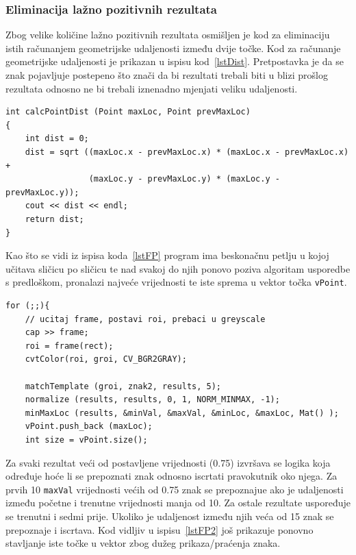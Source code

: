 \newpage
\subsubsection{Eliminacija lažno pozitivnih rezultata} %
\label{ssub:Eliminacija lažno pozitivnih rezultata}

Zbog velike količine lažno pozitivnih rezultata osmišljen je kod za
eliminaciju istih računanjem geometrijske udaljenosti između dvije
točke. Kod za računanje geometrijske udaljenosti je prikazan u ispisu
kod~\ref{lstDist}. Pretpostavka je da se znak pojavljuje postepeno što
znači da bi rezultati trebali biti u blizi prošlog rezultata odnosno ne
bi trebali iznenadno mjenjati veliku udaljenosti. 

\begin{lstlisting}[label=lstDist,caption={Izvorni kod računanja
geometrijske udaljenosti između dvije točke}]
int calcPointDist (Point maxLoc, Point prevMaxLoc)
{
    int dist = 0;
    dist = sqrt ((maxLoc.x - prevMaxLoc.x) * (maxLoc.x - prevMaxLoc.x) +
                 (maxLoc.y - prevMaxLoc.y) * (maxLoc.y - prevMaxLoc.y));    
    cout << dist << endl;
    return dist;
}
\end{lstlisting}

Kao što se vidi iz ispisa koda~\ref{lstFP} program ima beskonačnu petlju
u kojoj učitava sličicu po sličicu te nad svakoj do njih ponovo poziva
algoritam usporedbe s predloškom, pronalazi najveće vrijednosti te 
iste sprema u vektor točka \texttt{vPoint}. 

\begin{lstlisting}[label=lstFP,caption={Izvorni kod obrade svih učitanih
        sličica }]
for (;;){
    // ucitaj frame, postavi roi, prebaci u greyscale
    cap >> frame;              
    roi = frame(rect);
    cvtColor(roi, groi, CV_BGR2GRAY);
    
    matchTemplate (groi, znak2, results, 5);
    normalize (results, results, 0, 1, NORM_MINMAX, -1);
    minMaxLoc (results, &minVal, &maxVal, &minLoc, &maxLoc, Mat() );
    vPoint.push_back (maxLoc);
    int size = vPoint.size();
\end{lstlisting}
    
Za svaki rezultat veći od postavljene vrijednosti (0.75) izvršava se
logika koja određuje hoće li se prepoznati znak odnosno iscrtati
pravokutnik oko njega. Za prvih 10 \texttt{maxVal} vrijednosti većih od
0.75 znak se prepoznajue ako je udaljenosti između početne i trenutne
vrijednosti manja od 10. Za ostale rezultate uspoređuje se trenutni i
sedmi prije. Ukoliko je udaljenost između njih veća od 15 znak se
prepoznaje i iscrtava. Kod vidljiv u ispisu~\ref{lstFP2} još prikazuje
ponovno stavljanje iste točke u vektor zbog dužeg prikaza/praćenja
znaka. 

